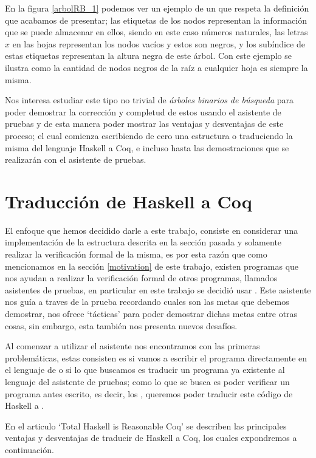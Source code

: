 En la figura \ref{arbolRB_1} podemos ver un ejemplo de un {\arn} que respeta la definici\'on que
acabamos de presentar; las etiquetas de los nodos representan la informaci\'on que se puede almacenar en ellos, siendo en este caso n\'umeros naturales, las letras $x$ en las hojas representan los nodos vacíos y estos
son negros, y los subíndice de estas etiquetas representan la altura negra de este \'arbol.
Con este ejemplo se ilustra como la cantidad de nodos negros de la ra\'iz a cualquier hoja es
siempre la misma.

Nos interesa estudiar este tipo no trivial de \textit{\'arboles binarios de búsqueda} para poder
demostrar la correcci\'on y completud de estos usando el asistente de pruebas {\coq} y de esta
manera poder mostrar las ventajas y desventajas de este proceso; el cual comienza escribiendo de
cero una estructura o traduciendo la misma del lenguaje Haskell a Coq, e incluso hasta las
demostraciones que se realizar\'an con el asistente de pruebas.

\section{Traducción de Haskell a Coq}
El enfoque que hemos decidido darle a este trabajo, consiste en considerar una implementaci\'on de la estructura descrita en la secci\'on pasada y solamente realizar la verificaci\'on formal de la misma, es por esta raz\'on que como mencionamos en la secci\'on \ref{motivation} de este trabajo, existen programas que nos ayudan a realizar la
verificaci\'on formal de otros programas, llamados asistentes de pruebas, en particular en este
trabajo se decidió usar {\coq}. Este asistente nos gu\'ia a traves de la prueba recordando cuales
son las metas que debemos demostrar, nos ofrece `t\'acticas' para poder demostrar dichas metas
entre otras cosas, sin embargo, esta tambi\'en nos presenta nuevos desaf\'ios.

Al comenzar a utilizar el asistente nos encontramos con las primeras problem\'aticas, estas
consisten es si vamos a escribir el programa directamente en el lenguaje de {\coq} o si lo que
buscamos es traducir un programa ya existente al lenguaje del asistente de pruebas; como lo que se
busca es poder verificar un programa antes escrito, es decir, los {\arns}, queremos poder traducir
este código de Haskell a {\coq}.

En el articulo `Total Haskell is Reasonable Coq' \cite{thrc} se describen las principales ventajas
y desventajas de traducir de Haskell a Coq, los cuales expondremos a continuaci\'on.

